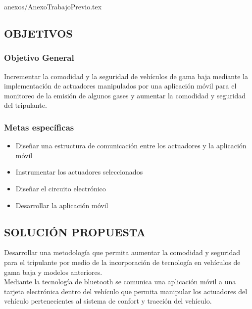  {anexos/AnexoTrabajoPrevio.tex}

\subsection{OBJETIVOS}
\subsubsection{Objetivo General}
Incrementar la comodidad y la seguridad de vehículos de gama baja mediante la implementación de actuadores manipulados por una aplicación móvil para el monitoreo de la emisión de algunos gases y aumentar la comodidad y seguridad del tripulante.


\subsubsection{Metas específicas}
  \begin{itemize}
           \item Diseñar una estructura de comunicación entre los actuadores y la aplicación móvil
\item Instrumentar los actuadores seleccionados
\item Diseñar el circuito electrónico
\item Desarrollar la aplicación móvil
  \end{itemize}



\subsection{SOLUCIÓN PROPUESTA}
Desarrollar una metodología que permita aumentar la comodidad y seguridad para el tripulante por medio de la incorporación de tecnología en vehículos de gama baja y modelos anteriores.\\

Mediante la tecnología de bluetooth se comunica una aplicación móvil a una tarjeta electrónica dentro del vehículo que permita manipular los actuadores del vehículo pertenecientes al sistema de confort y tracción del vehículo.\\
